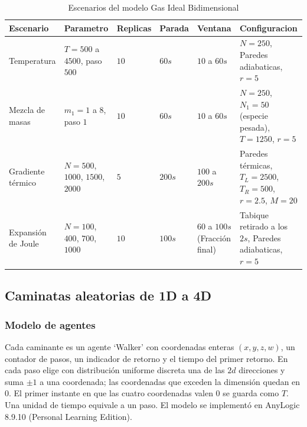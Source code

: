 \documentclass{article}
\begin{document}
\begin{table}[h]
\centering
\renewcommand{\arraystretch}{1.3} 
\caption{Escenarios del modelo Gas Ideal Bidimensional}
\begin{tabularx}{\textwidth}{ | Y | Y | Y | Y | Y | Y | }
    \hline
    \textbf{Escenario} & \textbf{Parametro} & \textbf{Replicas} & \textbf{Parada} & \textbf{Ventana} & \textbf{Configuracion} \\
    \hline
    Temperatura & $T=500$ a $4500$, paso $500$ & $10$ & $60 s$ & $10$ a $60 s$ & $N=250$, Paredes adiabaticas, $r=5$ \\
    \hline
    Mezcla de masas & $m_1=1$ a $8$, paso $1$ & $10$ & $60 s$ & $10$ a $60 s$ & $N=250$, $N_1=50$ (especie pesada), $T=1250$, $r=5$ \\
    \hline
    Gradiente térmico & $N=500$, $1000$, $1500$, $2000$ & $5$ & $200s$ & $100$ a $200 s$ & Paredes térmicas, $T_L=2500$, $T_R=500$, $r=2.5$, $M=20$ \\
    \hline
    Expansión de Joule & $N=100$, $400$, $700$, $1000$ & $10$ & $100 s$ & $60$ a $100 s$ (Fracción final) & Tabique retirado a los $2 s$, Paredes adiabaticas, $r=5$ \\
    \hline
\end{tabularx}
\end{table}

\subsection{Caminatas aleatorias de 1D a 4D}
\subsubsection{Modelo de agentes}
Cada caminante es un agente `Walker' con coordenadas enteras $(x,y,z,w)$, un contador de pasos, un indicador de retorno y el tiempo del primer retorno. En cada paso elige con distribución uniforme discreta una de las $2d$ direcciones y suma $\pm1$ a una coordenada; las coordenadas que exceden la dimensión quedan en 0. El primer instante en que las cuatro coordenadas valen 0 se guarda como $T$. Una unidad de tiempo equivale a un paso. El modelo se implementó en AnyLogic 8.9.10 (Personal Learning Edition).
\end{document}
